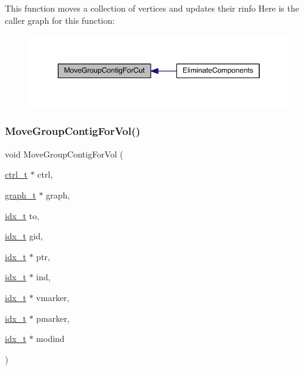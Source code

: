 This function moves a collection of vertices and updates their rinfo Here is the caller graph for this function\+:\nopagebreak
\begin{figure}[H]
\begin{center}
\leavevmode
\includegraphics[width=350pt]{a00945_a59be93c110982dd4b4e918957804e3b7_icgraph}
\end{center}
\end{figure}
\mbox{\label{a00945_ac9671fbb0e67a5e8bee0d578ebcd0382}} 
\subsubsection{\texorpdfstring{Move\+Group\+Contig\+For\+Vol()}{MoveGroupContigForVol()}}
{\footnotesize\ttfamily void Move\+Group\+Contig\+For\+Vol (\begin{DoxyParamCaption}\item[{\hyperlink{a00742}{ctrl\+\_\+t} $\ast$}]{ctrl,  }\item[{\hyperlink{a00734}{graph\+\_\+t} $\ast$}]{graph,  }\item[{\hyperlink{a00876_aaa5262be3e700770163401acb0150f52}{idx\+\_\+t}}]{to,  }\item[{\hyperlink{a00876_aaa5262be3e700770163401acb0150f52}{idx\+\_\+t}}]{gid,  }\item[{\hyperlink{a00876_aaa5262be3e700770163401acb0150f52}{idx\+\_\+t} $\ast$}]{ptr,  }\item[{\hyperlink{a00876_aaa5262be3e700770163401acb0150f52}{idx\+\_\+t} $\ast$}]{ind,  }\item[{\hyperlink{a00876_aaa5262be3e700770163401acb0150f52}{idx\+\_\+t} $\ast$}]{vmarker,  }\item[{\hyperlink{a00876_aaa5262be3e700770163401acb0150f52}{idx\+\_\+t} $\ast$}]{pmarker,  }\item[{\hyperlink{a00876_aaa5262be3e700770163401acb0150f52}{idx\+\_\+t} $\ast$}]{modind }\end{DoxyParamCaption})}


